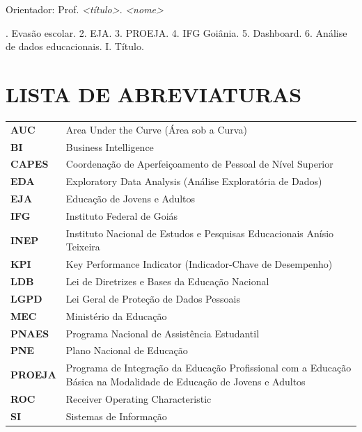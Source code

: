 \documentclass[12pt,a4paper]{article}
\begin{document}
\vspace{0.3cm}
\noindent Orientador: Prof. \textit{<título>}. \textit{<nome>}

\vspace{0.3cm}
. Evasão escolar. 2. EJA. 3. PROEJA. 4. IFG Goiânia. 5. Dashboard. 6. Análise de dados educacionais. I. Título.

\newpage
\tableofcontents
\newpage

\listoftables
{}

\listoffigures
{}
\newpage

\section*{LISTA DE ABREVIATURAS}

\begin{tabular}{ll}
\textbf{AUC} & Area Under the Curve (Área sob a Curva) \\
\textbf{BI}  & Business Intelligence \\
\textbf{CAPES} & Coordenação de Aperfeiçoamento de Pessoal de Nível Superior \\
\textbf{EDA} & Exploratory Data Analysis (Análise Exploratória de Dados) \\
\textbf{EJA} & Educação de Jovens e Adultos \\
\textbf{IFG} & Instituto Federal de Goiás \\
\textbf{INEP} & Instituto Nacional de Estudos e Pesquisas Educacionais Anísio Teixeira \\
\textbf{KPI} & Key Performance Indicator (Indicador-Chave de Desempenho) \\
\textbf{LDB} & Lei de Diretrizes e Bases da Educação Nacional \\
\textbf{LGPD} & Lei Geral de Proteção de Dados Pessoais \\
\textbf{MEC} & Ministério da Educação \\
\textbf{PNAES} & Programa Nacional de Assistência Estudantil \\
\textbf{PNE} & Plano Nacional de Educação \\
\textbf{PROEJA} & Programa de Integração da Educação Profissional com a Educação Básica na Modalidade de Educação de Jovens e Adultos \\
\textbf{ROC} & Receiver Operating Characteristic \\
\textbf{SI} & Sistemas de Informação \\
\end{tabular}
\newpage
\end{document}
